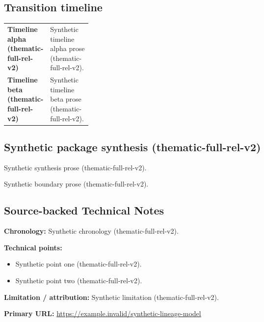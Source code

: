 \documentclass[lualatex,a4paper,10pt]{jlreq}
\begin{document}
\medskip
\begin{wideflow}
\subsection*{Transition timeline}
\begin{tabularx}{\linewidth}{@{}>{\bfseries}p{0.20\linewidth}X@{}}
Timeline alpha (thematic-full-rel-v2) & Synthetic timeline alpha prose (thematic-full-rel-v2). \cite{sp001lnd001} \\
Timeline beta (thematic-full-rel-v2) & Synthetic timeline beta prose (thematic-full-rel-v2). \cite{sp001lnd001} \\
\end{tabularx}
\end{wideflow}
\medskip
\begin{multicols}{2}
\subsection*{Synthetic package synthesis (thematic-full-rel-v2)}
\noindent Synthetic synthesis prose (thematic-full-rel-v2). \cite{sp001lnd001}\par\medskip
\end{multicols}
\medskip
\begin{claimboundary}
\noindent Synthetic boundary prose (thematic-full-rel-v2). \cite{sp001lnd001}\par
\end{claimboundary}
\medskip
\subsection*{Source-backed Technical Notes}
\begin{technicalnote}
\noindent\textbf{Chronology:} Synthetic chronology (thematic-full-rel-v2). \cite{sp001lnd001}\par
\smallskip\noindent\textbf{Technical points:}\par
\begin{itemize}
\item Synthetic point one (thematic-full-rel-v2). \cite{sp001lnd001}
\item Synthetic point two (thematic-full-rel-v2). \cite{sp001lnd001}
\end{itemize}
\noindent\textbf{Limitation / attribution:} Synthetic limitation (thematic-full-rel-v2).\par
\smallskip\noindent\textbf{Primary URL:} \url{https://example.invalid/synthetic-lineage-model}\par
\end{technicalnote}
\smallskip
\Needspace{0.30\textheight}
\end{document}
